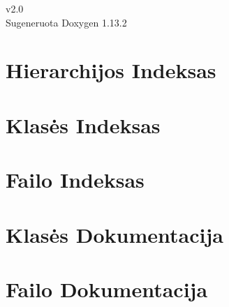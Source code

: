 \documentclass[twoside]{book}
\newcommand{\+}{\discretionary{\mbox{\scriptsize$\hookleftarrow$}}{}{}}
\newcommand{\clearemptydoublepage}{%
    \newpage{\pagestyle{empty}\cleardoublepage}%
  }
\begin{document}
  \raggedbottom
    \hypersetup{pageanchor=false,
                bookmarksnumbered=true,
                pdfencoding=unicode
               }
  \begin{titlepage}
  \vspace*{7cm}
  \begin{center}%
  {\Large v2.\+0}\\
  \vspace*{1cm}
  {\large Sugeneruota Doxygen 1.13.2}\\
  \end{center}
  \end{titlepage}
  \clearemptydoublepage
  \tableofcontents
  \clearemptydoublepage
  \hypersetup{pageanchor=true}
\chapter{Hierarchijos Indeksas}

\chapter{Klasės Indeksas}

\chapter{Failo Indeksas}

\chapter{Klasės Dokumentacija}


\chapter{Failo Dokumentacija}



  \backmatter
  \newpage
  \clearemptydoublepage
  \printindex
\end{document}
